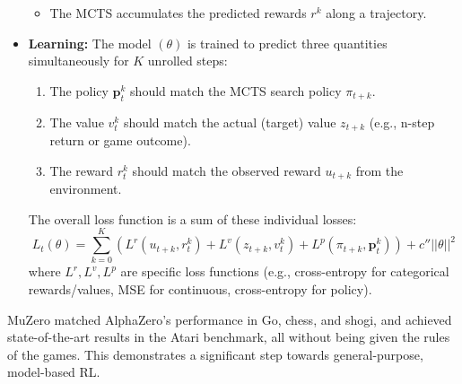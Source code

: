\documentclass[11pt,a4paper]{article}
\begin{document}
\begin{itemize}
\begin{itemize}
        \item The MCTS accumulates the predicted rewards $r^k$ along a trajectory.
    \end{itemize}
    \item \textbf{Learning:} The model $(\theta)$ is trained to predict three quantities simultaneously for $K$ unrolled steps:
    \begin{enumerate}
        \item The policy $\mathbf{p}_t^k$ should match the MCTS search policy $\pi_{t+k}$.
        \item The value $v_t^k$ should match the actual (target) value $z_{t+k}$ (e.g., n-step return or game outcome).
        \item The reward $r_t^k$ should match the observed reward $u_{t+k}$ from the environment.
    \end{enumerate}
    The overall loss function is a sum of these individual losses:
    \begin{equation}
        L_t(\theta) = \sum_{k=0}^{K} \left( L^r(u_{t+k}, r_t^k) + L^v(z_{t+k}, v_t^k) + L^p(\pi_{t+k}, \mathbf{p}_t^k) \right) + c'' ||\theta||^2
    \end{equation}
    where $L^r, L^v, L^p$ are specific loss functions (e.g., cross-entropy for categorical rewards/values, MSE for continuous, cross-entropy for policy).
\end{itemize}
MuZero matched AlphaZero's performance in Go, chess, and shogi, and achieved state-of-the-art results in the Atari benchmark, all without being given the rules of the games. This demonstrates a significant step towards general-purpose, model-based RL.
\end{document}
